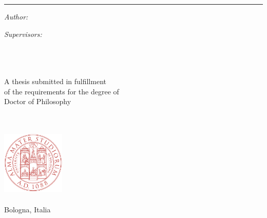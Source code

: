\begin{titlepage}
  \doublespacing
  \large
  \hfill
  \vfill
  \vspace*{0.5cm}
  \begin{center}
    \doublespacing
    \textcolor{Maroon}{\huge\textbf{\myTitle}}
  \end{center}
  \vspace{1.25cm}
  \hrule
  \vspace{1.5cm}
  \onehalfspacing
  \begin{center}

    \begin{minipage}[t]{0.5\textwidth}
      \begin{flushleft}
        \emph{Author:}\\
        \href{\myWebsite}{{\myFirstName} \textsc{\myLastName}}
      \end{flushleft}
    \end{minipage}
    \begin{minipage}[t]{0.4\textwidth}
      \begin{flushright}
        \emph{Supervisors:} \\
        \href{\myProfWebsite}{{\myProfTitle} {\myProfFirstName} \textsc{\myProfLastName}}\\
        \href{\myOtherProfWebsite}{{\myOtherProfTitle} {\myOtherProfFirstName} \textsc{\myOtherProfLastName}}\\
      \end{flushright}
    \end{minipage}\\[1.5cm]
    
    A thesis submitted in fulfillment\\
    of the requirements for the degree of\\
    {Doctor of Philosophy}\\[1cm]
    
    \myDepartment\\
    \mySchool\\
    \myFaculty

    \hfill
    \vfill

    \includegraphics[width=3cm]{figures/unibo.png}\\
    \href{https://unibo.it}{\myUni}\\
    Bologna, Italia\\[2em]
    {\mySubmissionMonth} {\mySubmissionYear}
  \end{center}
\end{titlepage}

